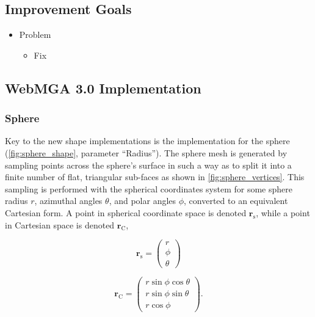 \subsection{Improvement Goals}
\begin{itemize}
  \item Problem
    \begin{itemize}
      \item Fix
    \end{itemize}
\end{itemize}

\subsection{WebMGA 3.0 Implementation}
\subsubsection{Sphere}
\label{sphere_gen_sec}
Key to the new shape implementations is the implementation for the sphere (\cref{fig:sphere_shape}, parameter ``Radius''). The sphere mesh is generated by sampling points across the sphere's surface in such a way as to split it into a finite number of flat, triangular sub-faces as shown in \cref{fig:sphere_vertices}. This sampling is performed with the spherical coordinates system for some sphere radius $r$, azimuthal angles $\theta$, and polar angles $\phi$, converted to an equivalent Cartesian form. A point in spherical coordinate space is denoted $\mathbf{r}_\mathrm{s}$, while a point in Cartesian space is denoted $\mathbf{r}_\mathrm{C}$,

\begin{equation}
\mathbf{r}_\mathrm{s}=\begin{pmatrix}r\\\phi\\\theta\end{pmatrix}
\label{sphere_equation_spherical}
\end{equation}

\begin{equation}
\mathbf{r}_\mathrm{C}=\begin{pmatrix}r\sin\phi \cos\theta\\
r\sin\phi \sin\theta\\
r\cos\phi\end{pmatrix}.
\label{sphere_equation_cartesian}
\end{equation}

